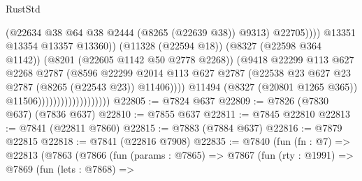 \begin{lexlean}{RustStd}
\begin{coremodule}
{\begin{coremodule}
{{{{{{{{{{{{{{{{{{{{{{{{{{{{{{{{{{{{{{{{{{{{{{{{{{{{{{                                                        (@22634
                                                          @38
                                                          @64
                                                          @38
                                                          @2444
                                                          (@8265 (@22639 @38))
                                                          @9313)
                                                        @22705))))
                                                @13351
                                                @13354
                                                @13357
                                                @13360))
                                            (@11328 (@22594 @18))
                                            (@8327 (@22598 @364 @1142))
                                            (@8201 (@22605 @1142 @50 @2778 @2268))
                                            (@9418
                                              @22299
                                              @113
                                              @627
                                              @2268
                                              @2787
                                              (@8596
                                                @22299
                                                @2014
                                                @113
                                                @627
                                                @2787
                                                (@22538
                                                  @23
                                                  @627
                                                  @23
                                                  @2787
                                                  (@8265 (@22543 @23))
                                                  @11406))))
                                          @11494
                                          (@8327 (@20801 @1265 @365))
                                          @11506)))))))))))))))))))
@22805 := @7824 @637
@22809 := @7826 (@7830 @637) (@7836 @637)
@22810 := @7855 @637
@22811 := @7845 @22810
@22813 := @7841 (@22811 @7860)
@22815 := @7883 (@7884 @637)
@22816 := @7879 @22815
@22818 := @7841 (@22816 @7908)
@22835 := @7840
    (fun (fn : @7) =>
    @22813
      (@7863
        (@7866
          (fun (params : @7865) =>
          @7867
            (fun (rty : @1991) =>
            @7869
              (fun (lets : @7868) =>
}}}}}}}}}}}}}}}}}}}}}}}}}}}}}}}}}}}}}}}}}}}}}}}}}}}}}}
\end{coremodule}}
\end{coremodule}
\end{lexlean}
